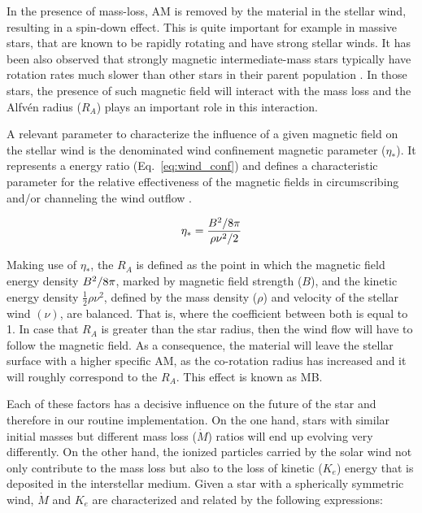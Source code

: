\documentclass[fleqn,usenatbib]{mnras}
\begin{document}
In the presence of mass-loss, AM is removed by the material in the stellar wind, resulting in a spin-down effect. This is quite important for example in massive stars, that are known to be rapidly rotating and have strong stellar winds. It has been also observed that strongly magnetic intermediate-mass stars typically have rotation rates much slower than other stars in their parent population \citep{Mathys2006}. In those stars, the presence of such magnetic field will interact with the mass loss and the Alfv\'{e}n radius ($R_{A}$) plays an important role in this interaction.\par

A relevant parameter to characterize the influence of a given magnetic field on the stellar wind is the denominated wind confinement magnetic parameter ($\eta_*$). It represents a energy ratio (Eq.~\ref{eq:wind_conf}) and defines a characteristic parameter for the relative effectiveness of the magnetic fields in circumscribing and/or channeling the wind outflow \citep{UdDoula2002}.\par

\begin{ceqn}
\begin{equation}
    \eta_* = \frac{B^{2}/8\pi}{\rho\nu^2/2} \label{eq:wind_conf}
\end{equation}
\end{ceqn}

Making use of $\eta_*$, the $R_{A}$ is defined as the point in which the magnetic field energy density $B^{2}/8\pi$, marked by magnetic field strength ($B$), and the kinetic energy density $\frac{1}{2}\rho\nu^{2}$, defined by the mass density ($\rho$) and velocity of the stellar wind $(\nu)$, are balanced. That is, where the coefficient between both is equal to 1. In case that $R_{A}$ is greater than the star radius, then the wind flow will have to follow the magnetic field. As a consequence, the material will leave the stellar surface with a higher specific AM, as the co-rotation radius has increased and it will roughly correspond to the $R_{A}$. This effect is known as MB.\par


Each of these factors has a decisive influence on the future of the star and therefore in our routine implementation. On the one hand, stars with similar initial masses but different mass loss ($\Dot{M}$) ratios will end up evolving very differently. On the other hand, the ionized particles carried by the solar wind not only contribute to the mass loss but also to the loss of kinetic ($K_e$) energy that is deposited in the interstellar medium. Given a star with a spherically symmetric wind, $\Dot{M}$ and $K_e$ are characterized and related by the following expressions:
\end{document}
